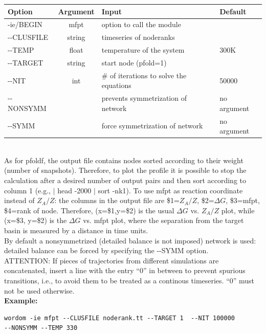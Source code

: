 \documentclass[11pt,twoside,onecolumn,a4paper,openright,notitlepage]{book}[2001/04/21]
\begin{document}
\noindent\begin{tabular}{l|c|l|l}
Option & Argument & Input & Default \\
\hline
-ie/BEGIN    & mfpt & option to call the module &\\
-{}-CLUSFILE & string & timeseries of noderanks &\\
-{}-TEMP     & float  & temperature of the system & 300K \\
-{}-TARGET   & string & start node (pfold=1) \\
-{}-NIT      & int    & \# of iterations to solve the equations & 50000\\
-{}-NONSYMM  &        &  prevents symmetrization of network & no argument\\
-{}-SYMM     &        &  force symmetrization of network & no argument\\
\end{tabular}\\

\noindent As for pfoldf, the output file contains nodes sorted according to their weight (number of snapshots). Therefore, to plot the profile it is possible to stop the calculation after a desired number of output pairs and then sort according to column 1 (e.g., $\mid$ head -2000 $\mid$ sort -nk1). To use mfpt as reaction coordinate instead of $Z_{A}/Z$: the columns in the output file are \$1=$Z_{A}/Z$, \$2=$\Delta{}G$, \$3=mfpt, \$4=rank of node. Therefore, (x=\$1,y=\$2) is the usual $\Delta{}G$ vs. $Z_{A}/Z$ plot, while (x=\$3, y=\$2) is the $\Delta{}G$ vs. mfpt plot, where the separation from the target basin is measured by a distance in time units.\\

\noindent By default a nonsymmetrized (detailed balance is not imposed) network is used: detailed balance can be forced by specifying the -{}-SYMM option.\\

\noindent ATTENTION: If pieces of trajectories from different simulations are concatenated, insert a line with the entry ``0'' in between to prevent spurious transitions, i.e., to avoid them to be treated as a continous timeseries. ``0'' must not be used otherwise.\\

{\bf Example:}

\begin{verbatim}wordom -ie mfpt --CLUSFILE noderank.tt --TARGET 1  --NIT 100000 
--NONSYMM --TEMP 330 \end{verbatim}
\end{document}
